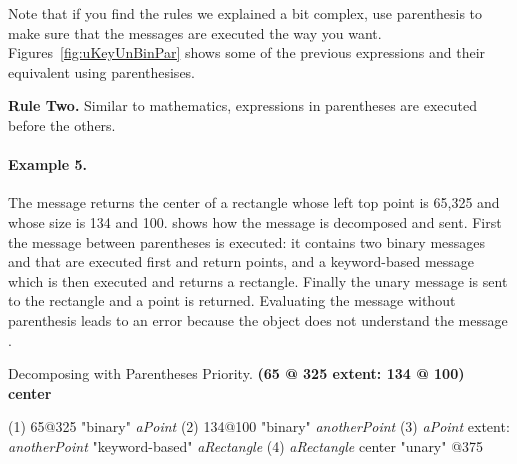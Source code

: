 Note that if you find the rules we explained a bit complex, use parenthesis to make sure that the messages are executed the way you want. Figures~\ref{fig:uKeyUnBinPar} shows some of the previous expressions and their equivalent using parenthesises. 

\begin{largecadre}{\textbf{Rule Two.} Similar to mathematics, expressions in parentheses are executed before the others. }
\end{largecadre}

\paragraph{Example 5.}
The message  returns the center of a rectangle whose left top point is 65,325 and whose size is 134 and 100.  shows how the message is decomposed and sent. First the message between parentheses is executed: it contains two binary messages  and  that are executed first and return points, and a keyword-based message  which is then executed and returns a rectangle. Finally the unary message  is sent to the rectangle and a point is returned. 
Evaluating the message without parenthesis leads to an error because the object  does not understand the message .

\begin{decomp}{Decomposing with Parentheses Priority.}\label{scr:decExtent}
      \textbf{(65 @ 325 extent: 134 @ 100) center}
      
(1)   65@325                                                                    "binary"
   \returns \emph{aPoint}
(2)                                134@100                                     "binary"
                                 \returns \emph{anotherPoint}
(3)   \emph{aPoint} extent: \emph{anotherPoint}                                       "keyword-based"
   \returns \emph{aRectangle}
(4)   \emph{aRectangle} center                                                     "unary"
   @375
\end{decomp}




